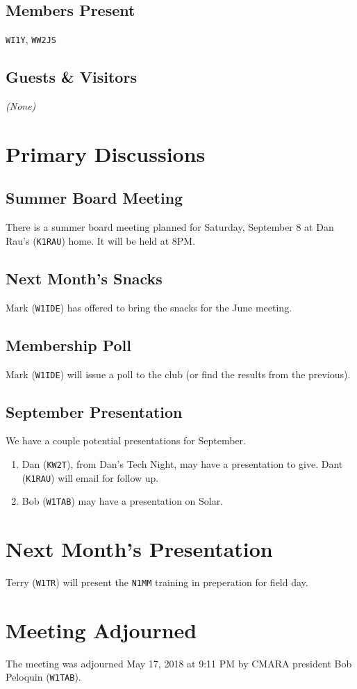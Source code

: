\documentclass[10pt,letterpaper]{article}
\begin{document}
\subsection{Members Present}
\texttt{WI1Y}, \texttt{WW2JS}

\subsection{Guests \& Visitors}
\emph{(None)}

\section{Primary Discussions}

\subsection{Summer Board Meeting}
There is a summer board meeting planned for Saturday, September 8 at Dan Rau's (\texttt{K1RAU}) home. It will be held at 8PM.

\subsection{Next Month's Snacks}
Mark (\texttt{W1IDE}) has offered to bring the snacks for the June meeting.

\subsection{Membership Poll}
Mark (\texttt{W1IDE}) will issue a poll to the club (or find the results from the previous).

\subsection{September Presentation}
We have a couple potential presentations for September.
\begin{enumerate}
  \item Dan (\texttt{KW2T}), from Dan's Tech Night, may have a presentation to give. Dant (\texttt{K1RAU}) will email for follow up.
  \item Bob (\texttt{W1TAB}) may have a presentation on Solar.
\end{enumerate}

\section{Next Month's Presentation}
Terry (\texttt{W1TR}) will present the \texttt{N1MM} training in preperation for field day.

\section{Meeting Adjourned}
The meeting was adjourned May 17, 2018 at 9:11 PM by CMARA president Bob Peloquin (\texttt{W1TAB}).
\end{document}
